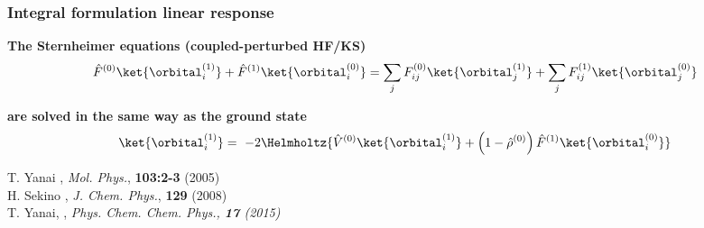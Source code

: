 \begin{frame}
    \frametitle{Integral formulation linear response}
    \centering
    \textbf{The Sternheimer equations (coupled-perturbed HF/KS)}
    \begin{equation}
        \nonumber
        \hat{F}^{(0)}\ket{\orbital_i^{(1)}} + \hat{F}^{(1)}\ket{\orbital_i^{(0)}} = 
        \sum_jF_{ij}^{(0)}\ket{\orbital_j^{(1)}} + \sum_j F_{ij}^{(1)}\ket{\orbital_j^{(0)}}
    \end{equation}

    \vspace{10mm}

    \textbf{are solved in the same way as the ground state}
    \begin{align}
        \nonumber
        \ket{\orbital_i^{(1)}} =\
        -2\Helmholtz{\hat{V}^{(0)}\ket{\orbital_i^{(1)}}
        + \left(1 - \hat{\rho}^{(0)}\right)\hat{F}^{(1)}\ket{\orbital_i^{(0)}}}
    \end{align}

\vspace{5mm}
\centering
\tiny
T. Yanai \etal,
{\it Mol. Phys.},
\textbf{103:2-3} 
(2005)\\
H. Sekino \etal,
{\it J. Chem. Phys.},
\textbf{129} 
(2008)\\
T. Yanai, \etal,
\it{Phys. Chem. Chem. Phys.}, 
\textbf{17}
(2015)

\end{frame}



